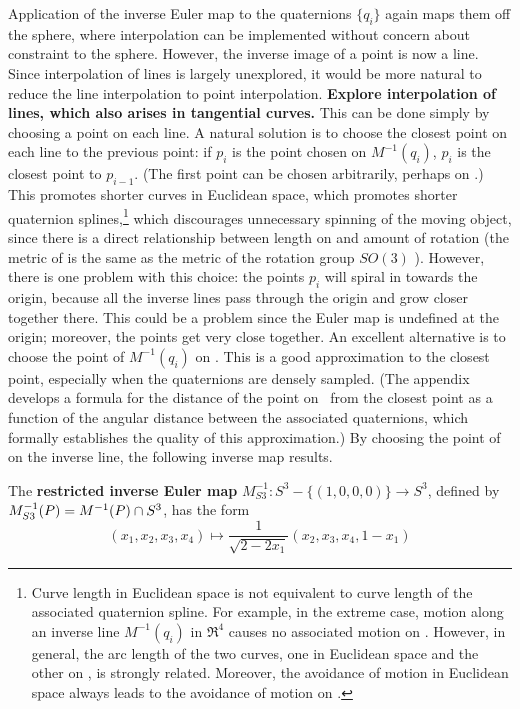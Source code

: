 \documentclass[11pt]{article}
\begin{document}
Application of the inverse Euler map to the quaternions $\{q_i\}$ again maps them 
off the sphere, where interpolation can be implemented without concern about
constraint to the sphere.
However, the inverse image of a point is now a line.
Since interpolation of lines is largely unexplored,
it would be more natural to reduce the line interpolation to point 
interpolation.
{\bf Explore interpolation of lines, which also arises in tangential curves.}
This can be done simply by choosing a point on each line.
A natural solution is to choose the closest point on each line to the previous point:
if $p_i$ is the point chosen on $M^{-1}(q_i)$, $p_i$ is the closest point to $p_{i-1}$.
(The first point can be chosen arbitrarily, perhaps on .)
This promotes shorter curves in Euclidean space, which promotes shorter quaternion 
splines,\footnote{Curve length in Euclidean space is not equivalent to curve length
  of the associated quaternion spline.
  For example, in the extreme case, motion along
	an inverse line $M^{-1}(q_i)$ in $\Re^4$ causes no associated
	motion on .  However, in general, the arc length
	of the two curves, one in Euclidean space and the other on ,
	is strongly related.
	Moreover, the avoidance of motion in Euclidean space always leads 
	to the avoidance of motion on .}
which discourages unnecessary spinning
of the moving object, since there is a direct relationship between length on  and 
amount of rotation (the metric of  is the same as the metric of the 
rotation group $SO(3)$ \cite{misner73}).
However, there is one problem with this choice: the points $p_i$ 
will spiral in towards the origin, because all the inverse lines pass through the origin
and grow closer together there.
This could be a problem since the Euler map is undefined at the origin;
moreover, the points get very close together.
An excellent alternative is to choose the point of $M^{-1}(q_i)$ on .
This is a good approximation to the closest point, especially when the quaternions
are densely sampled.
(The appendix develops a formula for the distance of the point on \ from
the closest point as a function of the angular distance between the associated
quaternions, which formally establishes the quality of this approximation.)
By choosing the point of  on the inverse line, the following inverse map results.
%
\begin{defn2}
The {\bf restricted inverse Euler map} $M^{-1}_{S3}: S^3 - \{(1,0,0,0)\} \rightarrow S^3$,
defined by $M^{-1}_{S3}(P) = M^{-1}(P) \nolinebreak \cap \nolinebreak S^3$, has the form
\begin{equation}
(x_1,x_2,x_3,x_4) \mapsto \frac{1}{\sqrt{2-2x_1}}(x_2,x_3,x_4,1-x_1)
\end{equation}
\end{defn2}
\end{document}
